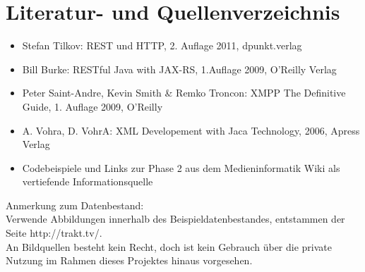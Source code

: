 

\chapter{Literatur- und Quellenverzeichnis}

\begin{itemize}
\item
Stefan Tilkov: REST und HTTP, 2. Auflage 2011, dpunkt.verlag
\item
Bill Burke: RESTful Java with JAX-RS, 1.Auflage 2009, O'Reilly Verlag
\item
Peter Saint-Andre, Kevin Smith \& Remko Troncon: XMPP The Definitive Guide, 1. Auflage 2009, O'Reilly
\item
A. Vohra, D. VohrA: XML Developement with Jaca Technology, 2006, Apress Verlag
\item
Codebeispiele und Links zur Phase 2 aus dem Medieninformatik Wiki als vertiefende Informationsquelle 

\end{itemize}

Anmerkung zum Datenbestand:\\
Verwende Abbildungen innerhalb des Beispieldatenbestandes, entstammen der Seite http://trakt.tv/.\\
An Bildquellen besteht kein Recht, doch ist kein Gebrauch über die private Nutzung im Rahmen dieses Projektes hinaus vorgesehen.

\newpage
